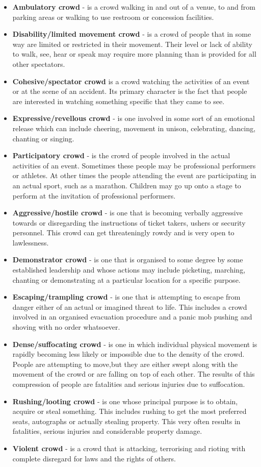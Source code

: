 \begin{itemize}
\item \textbf{Ambulatory crowd} - is a crowd walking in and out of a venue, to and from parking areas or walking to use restroom or concession facilities.
\item \textbf{Disability/limited movement crowd} - is a crowd of people that in some way are limited or restricted in their movement. Their level or lack of ability to walk, see, hear or speak may require more planning than is provided for all other spectators.
\item \textbf{Cohesive/spectator crowd} is a crowd watching the activities of an event or at the scene of an accident. Its primary character is the fact that people are interested in watching something specific that they came to see.
\item \textbf{Expressive/revellous crowd} - is one involved in some sort of an emotional release which can include cheering, movement in unison, celebrating, dancing, chanting or singing.
\item \textbf{Participatory crowd} - is the crowd of people involved in the actual activities of an event. Sometimes these people may be professional performers or athletes. At other times the people attending the event are participating in an actual sport, such as a marathon. Children may go up onto a stage to perform at the invitation of professional performers.
\item \textbf{Aggressive/hostile crowd} - is one that is becoming verbally aggressive towards or disregarding the instructions of ticket takers, ushers or security personnel. This crowd can get threateningly rowdy and is very open to lawlessness.
\item \textbf{Demonstrator crowd} - is one that is organised to some degree by some established leadership and whose actions may include picketing, marching, chanting or demonstrating at a particular location for a specific purpose.
\item \textbf{Escaping/trampling crowd} - is one that is attempting to escape from danger either of an actual or imagined threat to life. This includes a crowd involved in an organised evacuation procedure and a panic mob pushing and shoving with no order whatsoever.
\item \textbf{Dense/suffocating crowd} - is one in which individual physical movement is rapidly becoming less likely or impossible due to the density of the crowd. People are attempting to move,but they are either swept along with the movement of the crowd or are falling on top of each other. The results of this compression of people are fatalities and serious injuries due to suffocation.
\item \textbf{Rushing/looting crowd} - is one whose principal purpose is to obtain, acquire or steal something. This includes rushing to get the most preferred seats, autographs or actually stealing property. This very often results in fatalities, serious injuries and considerable property damage.
\item \textbf{Violent crowd} - is a crowd that is attacking, terrorising and rioting with complete disregard for laws and the rights of others.
\end{itemize}
